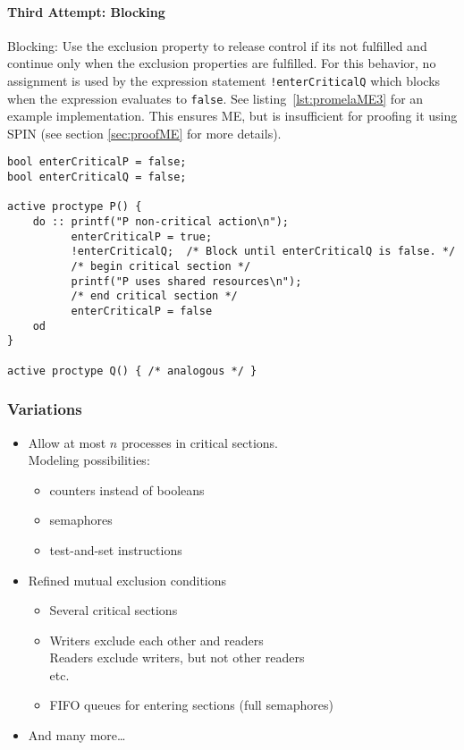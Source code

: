 \documentclass[a4paper, 11pt, accentcolor = tud3b]{tudreport}
\newcommand{\inlinePromela}[1]{\lstinline[language = PROMELA]|#1|}
\begin{document}
					\paragraph{Third Attempt: Blocking}
						Blocking: Use the exclusion property to release control if its not fulfilled and continue only when the exclusion properties are fulfilled. For this behavior, no assignment is used by the expression statement \inlinePromela{!enterCriticalQ} which blocks when the expression evaluates to \inlinePromela{false}. See listing~\ref{lst:promelaME3} for an example implementation. This ensures ME, but is insufficient for proofing it using SPIN (see section \ref{sec:proofME} for more details).
						
						\begin{lstlisting}[caption = { ME in PROMELA: Busy Waiting }, label = lst:promelaME2 language = PROMELA]
bool enterCriticalP = false;
bool enterCriticalQ = false;

active proctype P() {
	do :: printf("P non-critical action\n");
		  enterCriticalP = true;
		  !enterCriticalQ;  /* Block until enterCriticalQ is false. */
		  /* begin critical section */
		  printf("P uses shared resources\n");
		  /* end critical section */
		  enterCriticalP = false
	od
}

active proctype Q() { /* analogous */ }
						\end{lstlisting}

				\subsubsection{Variations}
					\begin{itemize}
						\item Allow at most \(n\) processes in critical sections. \\ Modeling possibilities:
							\begin{itemize}
								\item counters instead of booleans
								\item semaphores
								\item test-and-set instructions
							\end{itemize}
						\item Refined mutual exclusion conditions
							\begin{itemize}
								\item Several critical sections
								\item Writers exclude each other and readers \\ Readers exclude writers, but not other readers \\ etc.
								\item FIFO queues for entering sections (full semaphores)
							\end{itemize}
						\item And many more\dots
					\end{itemize}
\end{document}
